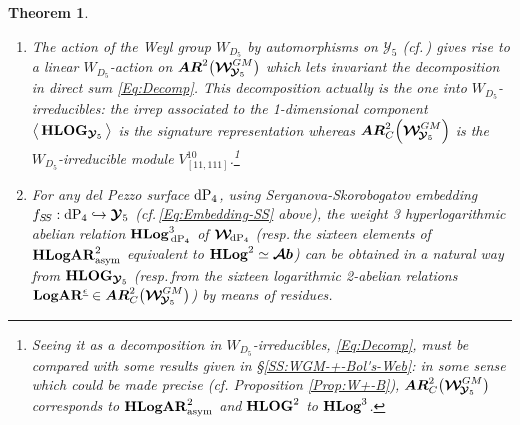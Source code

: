\documentclass[11pt]{amsart}
\newcommand{\sk}{\smallskip}
\newcommand{\mk}{\medskip}
\newtheorem{thm}{Theorem}[section]
\begin{document}
\begin{thm}
\begin{enumerate}
\item[6.] The action of the Weyl group $W_{D_5}$ 
by automorphisms on $\boldsymbol{\mathcal Y}_5$ ({\it cf.}\,\cite[Theorem 2.2]{Skorobogatov}{\rm )} gives rise to a linear 
$W_{D_5}$-action  on $
\boldsymbol{AR}^{2}\big( 
 \boldsymbol{\mathcal W}^{GM}_{ \hspace{-0.05cm}
\boldsymbol{\mathcal Y}_5}\big)$ which lets invariant the decomposition in direct sum \eqref{Eq:Decomp}. This decomposition actually is the one into $W_{D_5}$-irreducibles: the irrep associated to the 1-dimensional component 
$\big\langle\,
{\bf HLOG}_{ \boldsymbol{\mathcal Y}_5 }
\, 
\big\rangle$ is the signature representation whereas $\boldsymbol{AR}^{2}_C\Big( 
 \boldsymbol{\mathcal W}^{GM}_{ \hspace{-0.05cm}
\boldsymbol{\mathcal Y}_5}\Big)$ is the $W_{D_5}$-irreducible module $V^{10}_{[11,111]}$.\footnote{Seeing it as  a decomposition in $W_{D_5}$-irreducibles,  
\eqref{Eq:Decomp},
must be compared with some results given in \S\ref{SS:WGM-+-Bol's-Web}: in some sense which could be made precise (cf. Proposition \ref{Prop:W+-B}), 
$\boldsymbol{AR}^{2}_C\big( 
 \boldsymbol{\mathcal W}^{GM}_{ \hspace{-0.05cm}
\boldsymbol{\mathcal Y}_5}\big)$ corresponds to ${\bf HLogAR}^2_{\rm asym}$ 
and ${\bf HLOG}^2$ to ${\bf HLog}^3$.}
\mk
\item[7.] For any del Pezzo surface ${\rm dP}_4$, using Serganova-Skorobogatov embedding $f_{S\hspace{-0.05cm} S}: {\rm dP}_4 \hookrightarrow \boldsymbol{\mathcal Y}_5$ (cf.\,\eqref{Eq:Embedding-SS} above), 
the weight 3 hyperlogarithmic abelian relation ${\bf HLog}^3_{  \hspace{0.05cm} {\rm dP}_4}$ 
of $\boldsymbol{\mathcal W}_{  \hspace{-0.05cm} {\rm dP}_4}$ 
(resp.\,the sixteen elements of ${\bf HLogAR}^2_{\rm asym}$
 equivalent to ${\bf HLog}^2\simeq  \boldsymbol{\mathcal Ab}$)  
can be obtained in a natural way from 
${\bf HLOG}_{ \boldsymbol{\mathcal Y}_5 } $ (resp.\,from the sixteen logarithmic 2-abelian relations ${\bf LogAR}^{\underline{\epsilon}}\in \boldsymbol{AR}^{2}_C\big( 
 \boldsymbol{\mathcal W}^{GM}_{ \hspace{-0.05cm}
\boldsymbol{\mathcal Y}_5}\big)${\rm )} by means of residues. 
\end{enumerate}
\end{thm}
\end{document}
